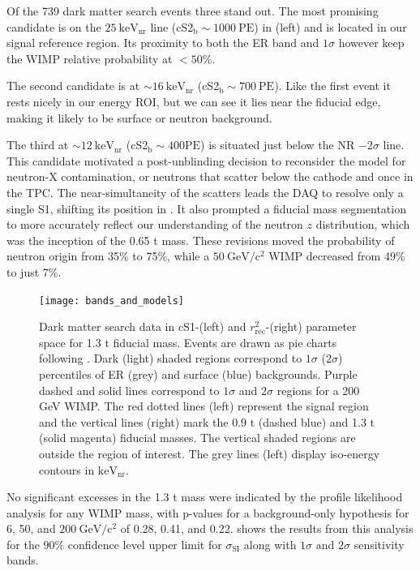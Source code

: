Of the 739 dark matter search events three stand out.  The most promising candidate is
on the $25\ \mathrm{keV_{nr}}$ line (cS2$_{\mathrm{b}} \sim 1000\ \mathrm{PE}$) in  (left) and is
located in our signal reference region.  Its proximity to both the ER band and $1 \sigma$ however keep the WIMP relative probability at
$< 50\%$.

The second candidate is at ${\sim} 16\ \mathrm{keV_{nr}}$ (cS2$_{\mathrm{b}} \sim 700\ \mathrm{PE}$).  Like the first event it
rests nicely in our energy ROI, but we can see it lies near the fiducial edge, making it likely to be surface or
neutron background.

The third at ${\sim} 12\ \mathrm{keV_{nr}}$ (cS2$_{\mathrm{b}} \sim 400 \mathrm{PE}$) is situated just below the NR
$-2 \sigma$ line.  This candidate motivated a post-unblinding decision to reconsider the model for neutron-X contamination, or neutrons
that scatter below the cathode and once in the TPC.  The near-simultaneity of the scatters leads the DAQ to resolve only a single
S1, shifting its position in .  It also prompted
a fiducial mass segmentation to more accurately reflect our understanding of the neutron $z$ distribution, which was the inception of the
0.65 t mass.  These revisions moved the probability of neutron origin from 35\% to 75\%, while a $50\ \mathrm{GeV/c^2}$ WIMP
decreased from 49\% to just 7\%.

\begin{figure}
\centering
\texttt{[image: bands\_and\_models]}
\caption{Dark matter search data in cS1-\cstwob (left) and $r_{\mathrm{rec}}^2$-\cstwob (right) parameter space for 1.3 t fiducial
mass.  Events are drawn as pie charts following .  Dark (light) shaded regions correspond to
$1 \sigma$ ($2 \sigma$) percentiles of ER (grey) and surface (blue) backgrounds.  Purple dashed and solid lines
correspond to $1 \sigma$ and $2 \sigma$ regions for a 200 GeV WIMP.  The red dotted lines (left) represent the signal region
and the vertical lines (right) mark the 0.9 t (dashed blue) and 1.3 t (solid magenta) fiducial masses.  The vertical shaded
regions are outside the region of interest.  The grey lines (left) display iso-energy contours in $\mathrm{keV_{nr}}$.}
\label{fig:dark_matter_results_bands}
\end{figure}

No significant excesses in the 1.3 t mass were indicated by the profile likelihood analysis for any WIMP mass, with p-values for
a background-only hypothesis for 6, 50, and $200\ \mathrm{GeV/c^2}$ of 0.28, 0.41, and
0.22.   shows the results from this analysis for the 90\% confidence level upper limit
for $\sigma_{\mathrm{SI}}$ along with $1\sigma$ and $2\sigma$ sensitivity bands.

